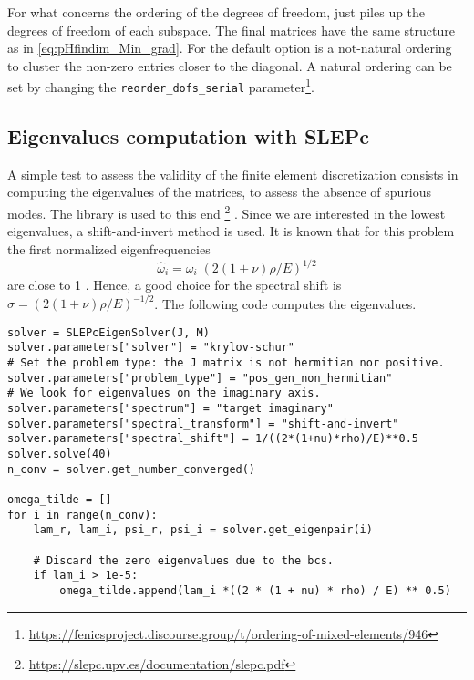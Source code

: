 For what concerns the ordering of the degrees of freedom, \firedrake just piles up the degrees of freedom of each subspace. The final matrices have the same structure as in \eqref{eq:pHfindim_Min_grad}. For \fenics the default option is a not-natural ordering to cluster the non-zero entries closer to the diagonal. A natural ordering can be set by changing the \verb|reorder_dofs_serial| parameter\footnote{\url{https://fenicsproject.discourse.group/t/ordering-of-mixed-elements/946}}.

\subsection*{Eigenvalues computation with SLEPc}
A simple test to assess the validity of the finite element discretization consists in computing the eigenvalues of the matrices, to assess the absence of spurious modes. The {} library is used to this end \footnote{\url{https://slepc.upv.es/documentation/slepc.pdf}} \cite{hernandez2005slepc}. Since we are interested in the lowest eigenvalues, a shift-and-invert method is used. It is known that for this problem the first normalized eigenfrequencies
\[
\widehat{\omega}_i = \omega_i \; (2(1+\nu)\rho/E)^{1/2}
\]
are close to 1 \cite{dawe1980rayleigh}. Hence, a good choice for the spectral shift is $\sigma = (2(1+\nu)\rho/E)^{-1/2}$.  The following code computes the eigenvalues.
\begin{tcolorbox}[title = Eigenvalues computation in  \fenics, coltitle=black, breakable, size=fbox, boxrule=1pt, pad at break*=1mm, colframe=red, enlarge top by=0.25em, enlarge bottom by=0.5em]
\begin{Verbatim}[tabsize=4]
solver = SLEPcEigenSolver(J, M)
solver.parameters["solver"] = "krylov-schur"
# Set the problem type: the J matrix is not hermitian nor positive.
solver.parameters["problem_type"] = "pos_gen_non_hermitian"
# We look for eigenvalues on the imaginary axis.
solver.parameters["spectrum"] = "target imaginary"
solver.parameters["spectral_transform"] = "shift-and-invert"
solver.parameters["spectral_shift"] = 1/((2*(1+nu)*rho)/E)**0.5
solver.solve(40)
n_conv = solver.get_number_converged()

omega_tilde = []
for i in range(n_conv):
	lam_r, lam_i, psi_r, psi_i = solver.get_eigenpair(i)
	
	# Discard the zero eigenvalues due to the bcs.
	if lam_i > 1e-5:
		omega_tilde.append(lam_i *((2 * (1 + nu) * rho) / E) ** 0.5)
\end{Verbatim}
\end{tcolorbox}
